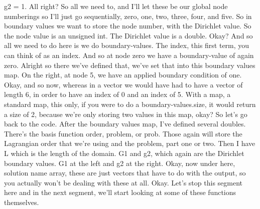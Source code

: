 \documentclass[10pt]{article}
\begin{document}
g2 = 1. All right? So all we need to, and I'll let these be our global node numberings so I'll just go sequentially, zero, one, two, three, four, and five. So in boundary values we want to store the node number, with the Dirichlet value. So the node value is an unsigned int. The Dirichlet value is a double. Okay? And so all we need to do here is we do boundary-values. The index, this first term, you can think of as an index. And so at node zero we have a boundary-value of again zero. Alright so there we've defined that, we've set that into this boundary values map. On the right, at node 5, we have an applied boundary condition of one. Okay, and so now, whereas in a vector we would have had to have a vector of length 6, in order to have an index of 0 and an index of 5. With a map, a standard map, this only, if you were to do a boundary-values.size, it would return a size of 2, because we're only storing two values in this map, okay? So let's go back to the code. After the boundary values map, I've defined several doubles. There's the basis function order, problem, or prob. Those again will store the Lagrangian order that we're using and the problem, part one or two. Then I have L which is the length of the domain. G1 and g2, which again are the Dirichlet boundary values. G1 at the left and g2 at the right. Okay, now under here, solution name array, these are just vectors that have to do with the output, so you actually won't be dealing with these at all. Okay. Let's stop this segment here and in the next segment, we'll start looking at some of these functions themselves.
\end{document}
